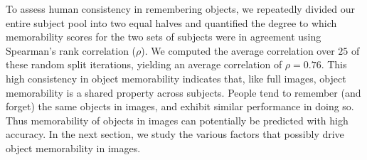 To assess human consistency in remembering objects, we repeatedly divided our entire subject pool into two equal halves and quantified the degree to which memorability scores for the two sets of subjects were in agreement using Spearman’s rank correlation ($\rho$). We computed the average correlation over $25$ of these random split iterations, yielding an average correlation of $\rho=0.76$. This high consistency in object memorability indicates that, like full images, object memorability is a shared property across subjects. People tend to remember (and forget) the same objects in images, and exhibit similar performance in doing so. Thus memorability of objects in images can potentially be predicted with high accuracy. In the next section, we study the various factors that possibly drive object memorability in images.

